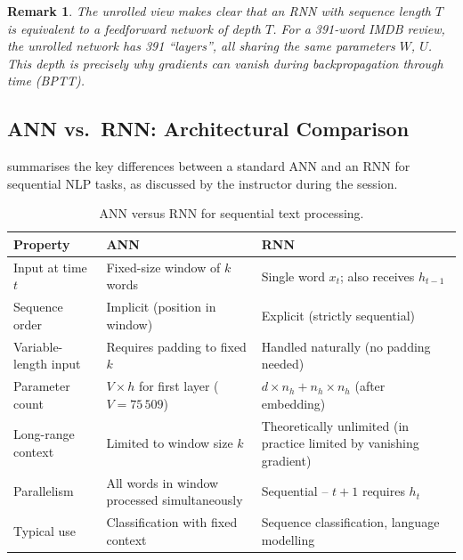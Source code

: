 \documentclass[12pt,a4paper]{article}
\newtheorem{remark}{Remark}[section]
\begin{document}
\begin{remark}
  The unrolled view makes clear that an RNN with sequence length $T$
  is equivalent to a feedforward network of depth $T$.  For a 391-word
  IMDB review, the unrolled network has 391 ``layers'', all sharing
  the same parameters $W$, $U$.  This depth is precisely why
  gradients can vanish during backpropagation through time (BPTT).
\end{remark}

\subsection{ANN vs.\ RNN: Architectural Comparison}
\label{subsec:ann_vs_rnn}

 summarises the key differences between a
standard ANN and an RNN for sequential NLP tasks, as discussed by
the instructor during the session.

\begin{table}[ht]
  \centering
  \caption{ANN versus RNN for sequential text processing.}
  \label{tab:ann_vs_rnn}
  \begin{tabularx}{\linewidth}{lXX}
    \toprule
    \textbf{Property} & \textbf{ANN} & \textbf{RNN} \\
    \midrule
    Input at time $t$ & Fixed-size window of $k$ words
                      & Single word $x_t$; also receives $h_{t-1}$ \\
    \addlinespace
    Sequence order & Implicit (position in window)
                   & Explicit (strictly sequential) \\
    \addlinespace
    Variable-length input & Requires padding to fixed $k$
                          & Handled naturally (no padding needed) \\
    \addlinespace
    Parameter count & $V \times h$ for first layer ($V = 75\,509$)
                    & $d \times n_h + n_h \times n_h$ (after embedding) \\
    \addlinespace
    Long-range context & Limited to window size $k$
                       & Theoretically unlimited (in practice limited by vanishing gradient) \\
    \addlinespace
    Parallelism & All words in window processed simultaneously
                & Sequential -- $t+1$ requires $h_t$ \\
    \addlinespace
    Typical use & Classification with fixed context
                & Sequence classification, language modelling \\
    \bottomrule
  \end{tabularx}
\end{table}
\end{document}
